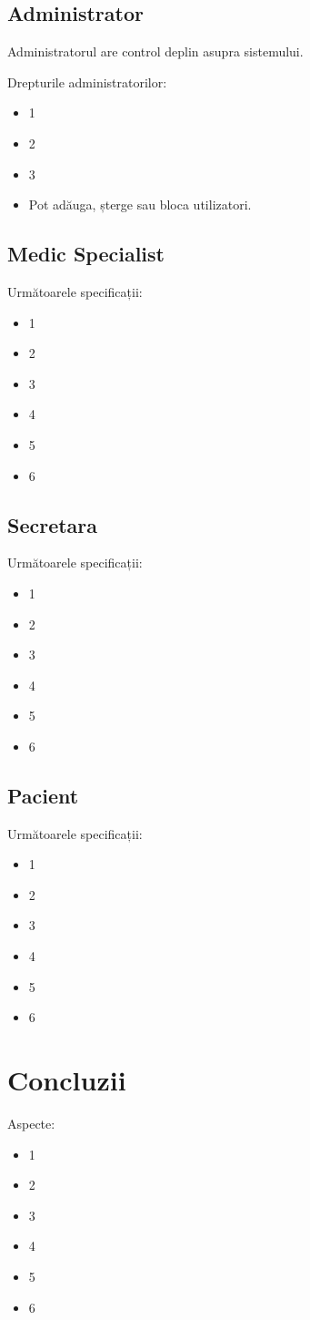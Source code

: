 \documentclass[a4paper,12pt]{article}
\begin{document}
\subsection{Administrator}

Administratorul are control deplin asupra sistemului.

Drepturile administratorilor:

\begin{itemize}
\item 1
\item 2
\item 3
\item Pot adăuga, șterge sau bloca utilizatori.
\end{itemize}

\subsection{Medic Specialist}

Următoarele specificații:

\begin{itemize}
\item 1
\item 2
\item 3
\item 4
\item 5
\item 6
\end{itemize}

\subsection{Secretara}

Următoarele specificații:

\begin{itemize}
\item 1
\item 2
\item 3
\item 4
\item 5
\item 6
\end{itemize}

\subsection{Pacient}

Următoarele specificații:

\begin{itemize}
\item 1
\item 2
\item 3
\item 4
\item 5
\item 6
\end{itemize}

\section{Concluzii}

Aspecte:

\begin{itemize}
\item 1
\item 2
\item 3
\item 4
\item 5
\item 6
\end{itemize}
\end{document}
